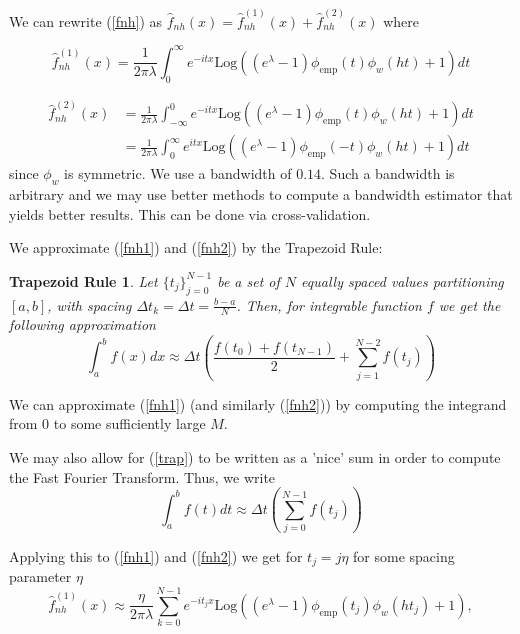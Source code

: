 \documentclass[a4paper,11pt]{article}
\theoremstyle{theorem}
\newtheorem*{trapezoid}{Trapezoid Rule}
\theoremstyle{definition}
\theoremstyle{remark}
\begin{document}
We can rewrite (\ref{fnh}) as $\hat{f}_{nh}(x) = \hat{f}_{nh}^{(1)}(x) + \hat{f}_{nh}^{(2)}(x)$ where

\begin{equation} \label{fnh1}
\hat{f}_{nh}^{(1)}(x) = \frac{1}{2\pi\lambda}\int_{0}^{\infty}{e^{-itx}\text{Log}\left((e^{\lambda} - 1)\phi_{\text{emp}}(t)\phi_{w}(ht) + 1\right)}dt 
\end{equation}

\begin{align}
\hat{f}_{nh}^{(2)}(x) &= \frac{1}{2\pi\lambda}\int_{-\infty}^{0}{e^{-itx}\text{Log}\left((e^{\lambda} - 1)\phi_{\text{emp}}(t)\phi_{w}(ht) + 1\right)}dt \nonumber \\
                      &= \frac{1}{2\pi\lambda}\int_{0}^{\infty}{e^{itx}\text{Log}\left((e^{\lambda} - 1)\phi_{\text{emp}}(-t)\phi_{w}(ht) + 1\right)}dt \label{fnh2}
\end{align}
since $\phi_{w}$ is symmetric.
We use a bandwidth of $0.14$. Such a bandwidth is arbitrary and we may use better methods to compute a bandwidth estimator that yields better results. This can be done via cross-validation.

We approximate (\ref{fnh1}) and (\ref{fnh2}) by the Trapezoid Rule:
 
\begin{trapezoid}
Let $\{t_{j}\}_{j=0}^{N-1}$ be a set of $N$ equally spaced values partitioning $[a,b]$, with spacing $\Delta t_{k} = \Delta t = \frac{b-a}{N}$. Then, for integrable function $f$ we get the following approximation
\begin{equation} \label{trap}
\int_{a}^{b}{f(x)dx} \approx \Delta t\left( \frac{f(t_{0}) + f(t_{N-1})}{2} + \sum_{j=1}^{N-2}{f(t_{j})}\right)
\end{equation} 
\end{trapezoid}

We can approximate (\ref{fnh1}) (and similarly (\ref{fnh2})) by computing the integrand from $0$ to some sufficiently large $M$.

We may also allow for (\ref{trap}) to be written as a 'nice' sum in order to compute the Fast Fourier Transform. Thus, we write
\begin{equation}
\int_{a}^{b}{f(t)dt} \approx \Delta t\left(\sum_{j=0}^{N-1}{f(t_{j})}\right)
\end{equation} 

Applying this to (\ref{fnh1}) and (\ref{fnh2}) we get for $t_{j} = j\eta$ for some spacing parameter $\eta$
\begin{equation}
\hat{f}_{nh}^{(1)}(x) \approx \frac{\eta}{2\pi\lambda}\sum_{k=0}^{N-1}{e^{-it_{j}x}\text{Log}\left((e^{\lambda} - 1)\phi_{\text{emp}}(t_{j})\phi_{w}(ht_{j}) + 1\right)},
\end{equation}
\end{document}
